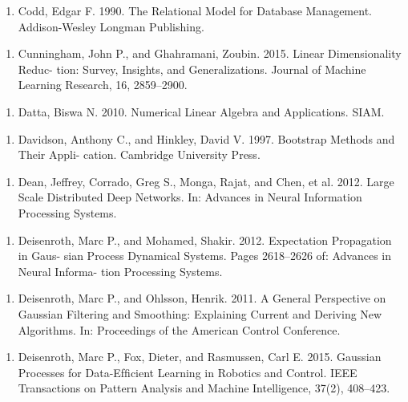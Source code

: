 \begin{enumerate}
\item Codd, Edgar F. 1990. The Relational Model for Database Management. Addison-Wesley Longman Publishing.
\end{enumerate}

\begin{enumerate}
\item Cunningham, John P., and Ghahramani, Zoubin. 2015. Linear Dimensionality Reduc- tion: Survey, Insights, and Generalizations. Journal of Machine Learning Research, 16, 2859–2900.
\end{enumerate}

\begin{enumerate}
\item Datta, Biswa N. 2010. Numerical Linear Algebra and Applications. SIAM.
\end{enumerate}

\begin{enumerate}
\item Davidson, Anthony C., and Hinkley, David V. 1997. Bootstrap Methods and Their Appli- cation. Cambridge University Press.
\end{enumerate}

\begin{enumerate}
\item Dean, Jeffrey, Corrado, Greg S., Monga, Rajat, and Chen, et al. 2012. Large Scale Distributed Deep Networks. In: Advances in Neural Information Processing Systems.
\end{enumerate}

\begin{enumerate}
\item Deisenroth, Marc P., and Mohamed, Shakir. 2012. Expectation Propagation in Gaus- sian Process Dynamical Systems. Pages 2618–2626 of: Advances in Neural Informa- tion Processing Systems.
\end{enumerate}

\begin{enumerate}
\item Deisenroth, Marc P., and Ohlsson, Henrik. 2011. A General Perspective on Gaussian Filtering and Smoothing: Explaining Current and Deriving New Algorithms. In: Proceedings of the American Control Conference.
\end{enumerate}

\begin{enumerate}
\item Deisenroth, Marc P., Fox, Dieter, and Rasmussen, Carl E. 2015. Gaussian Processes for Data-Efﬁcient Learning in Robotics and Control. IEEE Transactions on Pattern Analysis and Machine Intelligence, 37(2), 408–423.
\end{enumerate}

